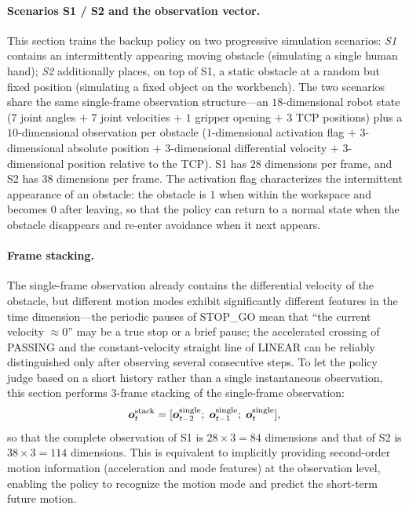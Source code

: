 \paragraph{Scenarios S1 / S2 and the observation vector.} This section trains the backup policy on two progressive simulation scenarios: \emph{S1} contains an intermittently appearing moving obstacle (simulating a single human hand); \emph{S2} additionally places, on top of S1, a static obstacle at a random but fixed position (simulating a fixed object on the workbench). The two scenarios share the same single-frame observation structure---an $18$-dimensional robot state ($7$ joint angles $+$ $7$ joint velocities $+$ $1$ gripper opening $+$ $3$ TCP positions) plus a $10$-dimensional observation per obstacle ($1$-dimensional activation flag $+$ $3$-dimensional absolute position $+$ $3$-dimensional differential velocity $+$ $3$-dimensional position relative to the TCP). S1 has $28$ dimensions per frame, and S2 has $38$ dimensions per frame. The activation flag characterizes the intermittent appearance of an obstacle: the obstacle is $1$ when within the workspace and becomes $0$ after leaving, so that the policy can return to a normal state when the obstacle disappears and re-enter avoidance when it next appears.

\paragraph{Frame stacking.} The single-frame observation already contains the differential velocity of the obstacle, but different motion modes exhibit significantly different features in the time dimension---the periodic pauses of STOP\_GO mean that ``the current velocity $\approx 0$'' may be a true stop or a brief pause; the accelerated crossing of PASSING and the constant-velocity straight line of LINEAR can be reliably distinguished only after observing several consecutive steps. To let the policy judge based on a short history rather than a single instantaneous observation, this section performs $3$-frame stacking of the single-frame observation:
\begin{equation*}
  \bm{o}_t^{\text{stack}} = [\bm{o}_{t-2}^{\text{single}};\; \bm{o}_{t-1}^{\text{single}};\; \bm{o}_t^{\text{single}}],
\end{equation*}
so that the complete observation of S1 is $28 \times 3 = 84$ dimensions and that of S2 is $38 \times 3 = 114$ dimensions. This is equivalent to implicitly providing second-order motion information (acceleration and mode features) at the observation level, enabling the policy to recognize the motion mode and predict the short-term future motion.

